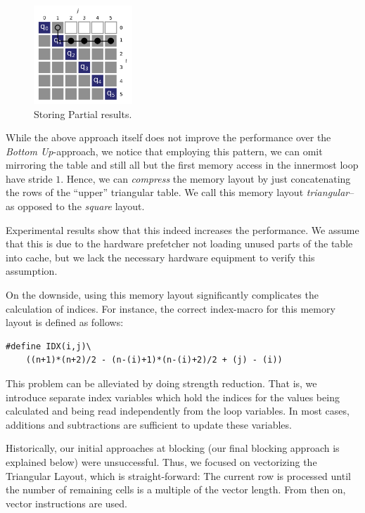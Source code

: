 \begin{figure}[htb]\centering
	\includegraphics[width=0.33\textwidth]{img/intermediate_access.png}
  \caption{Storing Partial results.\label{fig:partial}}
\end{figure}

 While the above approach itself does not improve the
performance over the \emph{Bottom Up}-approach, we notice that employing this
pattern, we can omit mirroring the table and still all but the first memory
access in the innermost loop have stride $1$. Hence, we can \emph{compress} the
memory layout by just concatenating the rows of the ``upper'' triangular table.
We call this memory layout \emph{triangular}--as opposed to the \emph{square}
layout.

Experimental results show that this indeed increases the performance. We assume
that this is due to the hardware prefetcher not loading unused parts of the
table into cache, but we lack the necessary hardware equipment to verify this
assumption.

On the downside, using this memory layout significantly complicates the
calculation of indices. For instance, the correct index-macro for this memory
layout is defined as follows:
\begin{center}
	\scriptsize
	\begin{verbatim}#define IDX(i,j)\
	((n+1)*(n+2)/2 - (n-(i)+1)*(n-(i)+2)/2 + (j) - (i))\end{verbatim}
\end{center}
This problem can be alleviated by doing strength reduction. That is, we
introduce separate index variables which hold the indices for the values being
calculated and being read independently from the loop variables. In most cases,
additions and subtractions are sufficient to update these variables.

 Historically, our initial approaches at
blocking (our final blocking approach is explained below) were unsuccessful.
Thus, we focused on vectorizing the Triangular Layout, which is
straight-forward: The current row is processed until the number of remaining
cells is a multiple of the vector length. From then on, vector instructions are
used.


